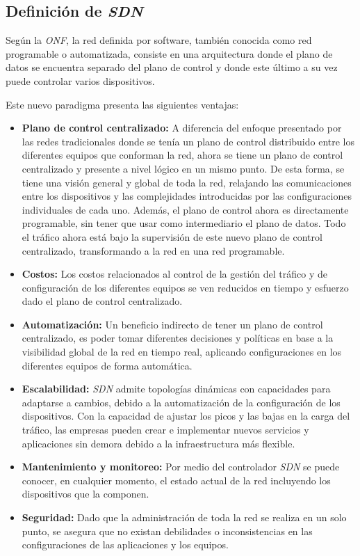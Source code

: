 \subsection{Definición de \textit{SDN}}
Según la \textit{ONF}, la red definida por software, también conocida como red programable o automatizada, consiste en una arquitectura donde el plano de datos se encuentra separado del plano de control y donde este último a su vez puede controlar varios dispositivos.

Este nuevo paradigma presenta las siguientes ventajas:

\begin{itemize}
	\item \textbf{Plano de control centralizado:} A diferencia del enfoque presentado por las redes tradicionales donde se tenía un plano de control distribuido entre los diferentes equipos que conforman la red, ahora se tiene un plano de control centralizado y presente a nivel lógico en un mismo punto. De esta forma, se tiene una visión general y global de toda la red, relajando las comunicaciones entre los dispositivos y las complejidades introducidas por las configuraciones individuales de cada uno. Además, el plano de control ahora es directamente programable, sin tener que usar como intermediario el plano de datos. Todo el tráfico ahora está bajo la supervisión de este nuevo plano de control centralizado, transformando a la red en una red programable. 
	\item \textbf{Costos:} Los costos relacionados al control de la gestión del tráfico y de configuración de los diferentes equipos se ven reducidos en tiempo y esfuerzo dado el plano de control centralizado.
	\item \textbf{Automatización:} Un beneficio indirecto de tener un plano de control centralizado, es poder tomar diferentes decisiones y políticas en base a la visibilidad global de la red en tiempo real, aplicando configuraciones en los diferentes equipos de forma automática.
	\item \textbf{Escalabilidad:} \textit{SDN} admite topologías dinámicas con capacidades para adaptarse a cambios, debido a la automatización de la configuración de los dispositivos. Con la capacidad de ajustar los picos y las bajas en la carga del tráfico, las empresas pueden crear e implementar nuevos servicios y aplicaciones sin demora debido a la infraestructura más flexible.
	\item \textbf{Mantenimiento y monitoreo:} Por medio del controlador \textit{SDN} se puede conocer, en cualquier momento, el estado actual de la red incluyendo los dispositivos que la componen.
	\item \textbf{Seguridad:} Dado que la administración de toda la red se realiza en un solo punto, se asegura que no existan debilidades o inconsistencias en las configuraciones de las aplicaciones y los equipos.
\end{itemize}

